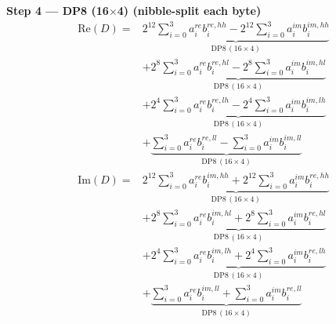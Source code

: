 \documentclass[fleqn]{article}
\newcommand{\DPop}[3]{\mathrm{DP#1}\,(#2\!\times\!#3)}
\begin{document}
\noindent\textbf{Step 4 --- DP8 (16$\times$4) \quad (nibble-split each byte)}
\begin{align*}
\mathrm{Re}(D) = {}
  & \underbrace{2^{12}\sum_{i=0}^{3} a_i^{re} b_i^{re,hh} - 2^{12}\sum_{i=0}^{3} a_i^{im} b_i^{im,hh}}_{\DPop{8}{16}{4}} \\[0.3em]
  & + \underbrace{2^{8}\sum_{i=0}^{3} a_i^{re} b_i^{re,hl} - 2^{8}\sum_{i=0}^{3} a_i^{im} b_i^{im,hl}}_{\DPop{8}{16}{4}} \\[0.3em]
  & + \underbrace{2^{4}\sum_{i=0}^{3} a_i^{re} b_i^{re,lh} - 2^{4}\sum_{i=0}^{3} a_i^{im} b_i^{im,lh}}_{\DPop{8}{16}{4}} \\[0.3em]
  & + \underbrace{\sum_{i=0}^{3} a_i^{re} b_i^{re,ll} - \sum_{i=0}^{3} a_i^{im} b_i^{im,ll}}_{\DPop{8}{16}{4}}
\end{align*}
\begin{align*}
\mathrm{Im}(D) = {}
  & \underbrace{2^{12}\sum_{i=0}^{3} a_i^{re} b_i^{im,hh} + 2^{12}\sum_{i=0}^{3} a_i^{im} b_i^{re,hh}}_{\DPop{8}{16}{4}} \\[0.3em]
  & + \underbrace{2^{8}\sum_{i=0}^{3} a_i^{re} b_i^{im,hl} + 2^{8}\sum_{i=0}^{3} a_i^{im} b_i^{re,hl}}_{\DPop{8}{16}{4}} \\[0.3em]
  & + \underbrace{2^{4}\sum_{i=0}^{3} a_i^{re} b_i^{im,lh} + 2^{4}\sum_{i=0}^{3} a_i^{im} b_i^{re,lh}}_{\DPop{8}{16}{4}} \\[0.3em]
  & + \underbrace{\sum_{i=0}^{3} a_i^{re} b_i^{im,ll} + \sum_{i=0}^{3} a_i^{im} b_i^{re,ll}}_{\DPop{8}{16}{4}}
\end{align*}

\vspace{0.3em}
\end{document}
